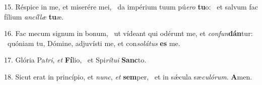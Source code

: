 15. Réspice in me, et miserére mei, \dag\  da impérium tuum pú\textit{e}\textit{ro} \textbf{tu}o: \ast\  et salvum fac fílium \textit{an}\textit{cíl}\textit{læ} \textbf{tu}æ.\

16. Fac mecum signum in bonum, \dag\  ut vídeant qui odérunt me, et \textit{con}\textit{fun}\textbf{dán}tur: \ast\  quóniam tu, Dómine, adjuvísti me, et con\textit{so}\textit{lá}\textit{tus} \textbf{es} me.\

17. Glória Pa\textit{tri}, \textit{et} \textbf{Fí}lio, \ast\  et Spi\textit{rí}\textit{tu}\textit{i} \textbf{Sanc}to.\

18. Sicut erat in princípio, et \textit{nunc}, \textit{et} \textbf{sem}per, \ast\  et in sǽcula sæ\textit{cu}\textit{ló}\textit{rum}. \textbf{A}men.\

